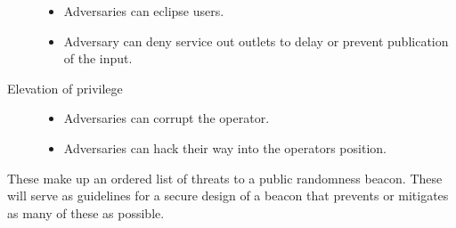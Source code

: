 \begin{description}
\begin{itemize}
                                \item Adversaries can eclipse users.
                                \item Adversary can deny service out outlets to delay or prevent publication of the input.
                              \end{itemize}
    \item [Elevation of privilege] \begin{itemize}
                                     \item Adversaries can corrupt the operator.
                                     \item Adversaries can hack their way into the operators position.
                                   \end{itemize}
\end{description}

These make up an ordered list of threats to a public randomness beacon. These will serve as guidelines for a secure design of a beacon that prevents or mitigates as many of these as possible.
